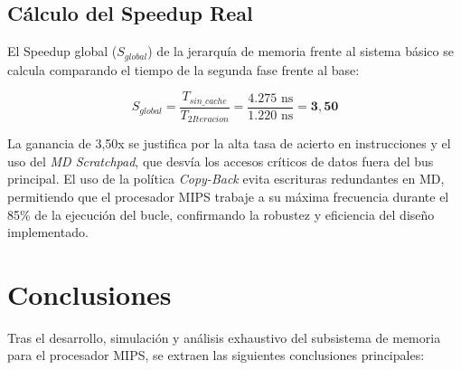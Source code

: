 \documentclass[12pt,a4paper]{article}
\begin{document}
\subsection{Cálculo del Speedup Real}

El Speedup global ($S_{global}$) de la jerarquía de memoria frente al sistema básico se calcula comparando el tiempo de la segunda fase frente al base:

\begin{equation}
    S_{global} = \frac{T_{sin\_cache}}{T_{2Iteracion}} = \frac{4.275 \text{ ns}}{1.220 \text{ ns}} = \mathbf{3,50}
\end{equation}

La ganancia de 3,50x se justifica por la alta tasa de acierto en instrucciones y el uso del \textit{MD Scratchpad}, que desvía los accesos críticos de datos fuera del bus principal. El uso de la política \textit{Copy-Back} evita escrituras redundantes en MD, permitiendo que el procesador MIPS trabaje a su máxima frecuencia durante el 85\% de la ejecución del bucle, confirmando la robustez y eficiencia del diseño implementado.

\newpage

    \section{Conclusiones}

    Tras el desarrollo, simulación y análisis exhaustivo del subsistema de memoria para el procesador MIPS, se extraen las siguientes conclusiones principales:
\end{document}
